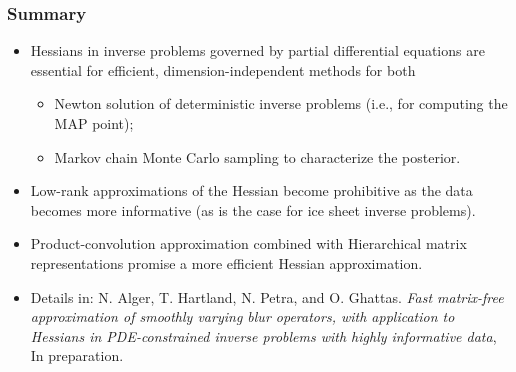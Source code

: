 \documentclass[10pt,final,xcolor=dvipsnames]{beamer}
\begin{document}
\begin{frame}
  \frametitle{Summary}

  \begin{itemize}
  \item Hessians in inverse problems governed by
    partial differential equations are essential for
    efficient, dimension-independent methods for both
    \begin{itemize}
    \item Newton solution of deterministic inverse problems (i.e., for
      computing the MAP point);
      \vspace{0.05in}
    \item Markov chain Monte Carlo sampling to characterize the
      posterior.
    \end{itemize}
    \vspace{0.05in}
  \item Low-rank approximations of the Hessian become
    prohibitive as the data becomes more informative (as is the case
    for ice sheet inverse problems).
    \vspace{0.05in}
  \item Product-convolution approximation combined with Hierarchical matrix representations promise a more efficient
    Hessian approximation.
  \end{itemize}
    \vspace{0.2in}
  \begin{itemize}
  \item [] \scriptsize{Details in: N. Alger, T. Hartland, N. Petra,
    and O. Ghattas. {\em Fast matrix-free approximation of smoothly
      varying blur operators, with application to Hessians in
      PDE-constrained inverse problems with highly informative data},
    In preparation.}
  \end{itemize}
\end{frame}
\end{document}
